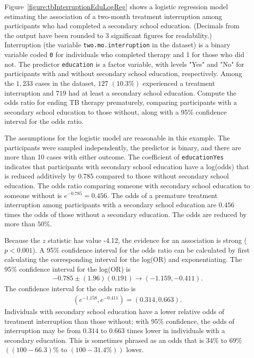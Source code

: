 \begin{examplewrap} 
  \begin{nexample}  {Figure~\ref{figure:tbInterruptionEduLogReg} shows a logistic regression model estimating the association of a two-month treatment interruption among participants who had completed a secondary school education. (Decimals from the output have been rounded to 3 significant figures for readability.) Interruption (the variable \texttt{two.mo.interruption} in the dataset) is a binary variable coded \texttt{0} for individuals who completed therapy and 1 for those who did not. The predictor \texttt{education} is a factor variable, with levels {"Yes"} and {"No"} for participants with and without secondary school education, respectively.  Among the $1,233$ cases in the dataset, $127$ $(10.3\%)$ experienced a treatment interruption and $719$ had at least a secondary school education. Compute the odds ratio for ending TB therapy prematurely, comparing participants with a secondary school education to those without, along with a 95\% confidence interval for the odds ratio.}

The assumptions for the logistic model are reasonable in this example. The participants were sampled independently, the predictor is binary, and there are more than 10 cases with either outcome.  The coefficient of \texttt{educationYes} indicates that participants with secondary school education have a log(odds) that is reduced additively by $0.785$ compared to those without secondary school education.  The odds ratio comparing someone with secondary school education to someone without is $e^{-0.785}=0.456$.  The odds of a premature treatment interruption among participants with a secondary school education are $0.456$ times the odds of those without a secondary education.  The odds are reduced by more than $50\%$.

Because the $z$ statistic has value -4.12, the evidence for an association is strong ($p < 0.001$).  A 95\% confidence interval for the odds ratio can be calculated by first calculating the corresponding interval for the log(OR) and exponentiating.  The 95\% confidence interval for the log(OR) is
\begin{align*}
  -0.785 \pm (1.96)(0.191) \longrightarrow (-1.159,-0.411).
\end{align*}
The confidence interval for the odds ratio is
\begin{align*}
  (e^{-1.158}, e^{-0.411}) = (0.314,0.663).
\end{align*}
    Individuals with secondary school education have a lower relative odds of treatment interruption than those without; with 95\% confidence, the odds of interruption may be from $0.314$ to $0.663$ times lower in individuals with a secondary education.  This is sometimes phrased as an odds that is $34\%$ to $69\%$ $((100 - 66.3)\% \text{ to } (100 - 31.4\%))$ lower.

\label{example:tbInterruptionEducation}
\end{nexample}
\end{examplewrap}

